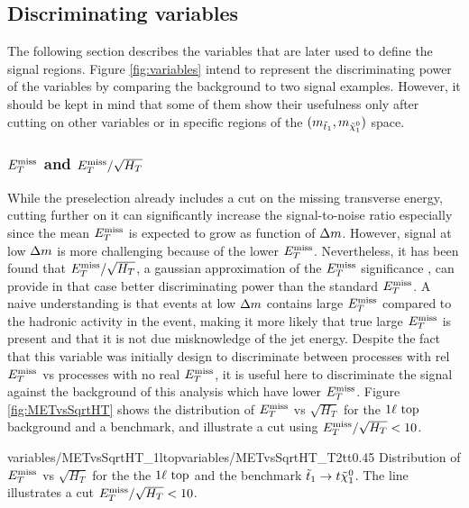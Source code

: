     \subsection{Discriminating variables \label{sec:analysis_variables}}

        The following section describes the variables that are later used to define the 
        signal regions. Figure \ref{fig:variables} intend to represent the discriminating
        power of the variables by comparing the background to two signal examples. However, 
        it should be kept in mind that some of them show their usefulness only after 
        cutting on other variables or in specific regions of the $(m_{\tilde{t}_1},m_{\tilde{\chi}_1^0})$ space.
           
           \subsubsection{$E_T^\text{miss}$ and $E_T^\text{miss}/\sqrt{H_T}$}

        While the preselection already includes a cut on the missing transverse energy, 
        cutting further on it can significantly increase the signal-to-noise ratio especially
        since the mean $E_T^\text{miss}$ is expected to grow as function of $\Delta m$. However, signal
        at low $\Delta m$ is more challenging because of the lower $E_T^\text{miss}$. Nevertheless,
        it has been found that $E_T^\text{miss}/\sqrt{H_T}$, a gaussian approximation of the $E_T^\text{miss}$ 
        significance \cite{METsignificanceMirman, METperf}, can provide in that case better 
        discriminating power than the 
        standard $E_T^\text{miss}$. A naive understanding is that events at low $\Delta m$ contains 
        large $E_T^\text{miss}$ compared to the hadronic activity in the event, making it more likely
        that true large $E_T^\text{miss}$ is present and that it is not due misknowledge of the jet 
        energy. Despite the fact that this variable was initially design to discriminate
        between processes with rel $E_T^\text{miss}$ vs processes with no real $E_T^\text{miss}$, it is useful here
        to discriminate the signal against the background of this analysis which have lower
        $E_T^\text{miss}$. Figure \ref{fig:METvsSqrtHT} shows the distribution of $E_T^\text{miss}$ vs $\sqrt{H_T}$ 
        for the $1\ell~\text{top}$ background and a benchmark, and illustrate a cut using 
        $E_T^\text{miss} / \sqrt{H_T} < 10$. 

                         {variables/METvsSqrtHT_1ltop}{variables/METvsSqrtHT_T2tt}{0.45}
                         {Distribution of $E_T^\text{miss}$ vs $\sqrt{H_T}$ for the the 
                         $1\ell~\text{top}$ and the benchmark $\tilde{t}_1 \rightarrow t \tilde{\chi}_1^0$.
                         The line illustrates a cut $E_T^\text{miss} / \sqrt{H_T} < 10$.}


